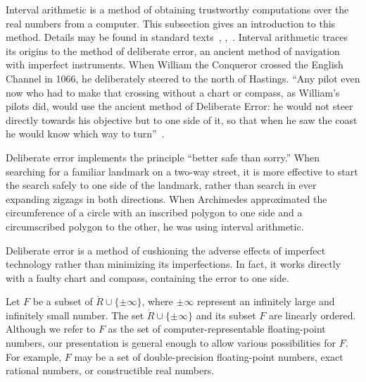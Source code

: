 Interval arithmetic is a method of obtaining trustworthy computations
over the real numbers from a computer.  This subsection gives an
introduction to this method.  Details may be found in standard
texts~\cite{Kearfott:1996:Interval},
\cite{Moore:1966:IntervalAnalysis},~\cite{Moore:2009:IntroIntAnalysis}.
Interval arithmetic  traces its
origins to the method of deliberate error,  an ancient method
of navigation with imperfect instruments.  When William the Conqueror
crossed the English Channel in 1066, he deliberately steered to the
north of Hastings.
  ``Any pilot even now who had to make that crossing without a chart
  or compass, as William's pilots did, would use the ancient method of
  Deliberate Error: he would not steer directly towards his objective
  but to one side of it, so that when he saw the coast he would know
  which way to turn''~\cite[p.~81]{How81}.


Deliberate error implements the principle ``better safe than sorry.''
When searching for a familiar landmark on a two-way street, it is more
effective to start the search safely to one side of the landmark,
rather than search in ever expanding zigzags in both directions.  When
Archimedes approximated the circumference of a circle with an inscribed
polygon to one side and a circumscribed polygon to the other, he was
using interval arithmetic.


Deliberate error is a method of cushioning the adverse effects of
imperfect technology rather than minimizing its imperfections.  In
fact, it works directly with a faulty chart and compass, containing
the error to one side.


Let $F$ be a subset of $\ring{R}\cup\{\pm\infty\}$,
where $\pm\infty$ represent an infinitely large and infinitely small number.  The set
$\ring{R}\cup\{\pm\infty\}$ and its subset $F$ are linearly ordered.
Although we refer to  $F$ as the set of computer-representable floating-point
numbers, our presentation is general enough to allow various
possibilities for $F$.  For example, $F$ may be a set of
double-precision floating-point numbers, exact rational numbers, or
constructible real numbers.  

